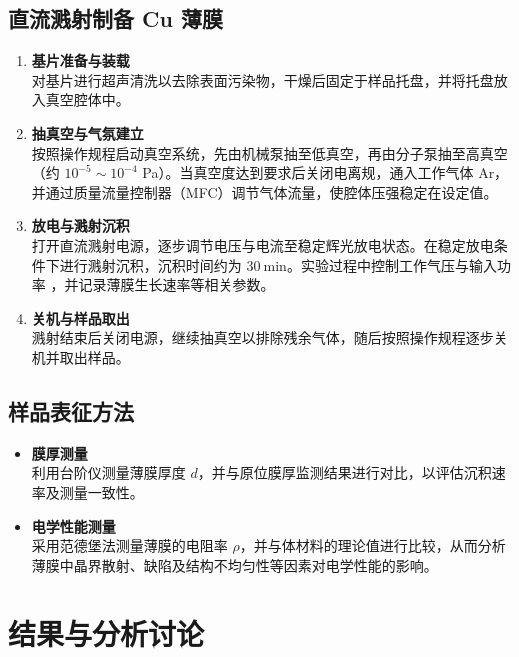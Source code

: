 \documentclass[a4paper, 1.5lines]{ctexart}
\begin{document}
        \subsection{直流溅射制备 Cu 薄膜}

\begin{enumerate}
    \item \textbf{基片准备与装载} \\
    对基片进行超声清洗以去除表面污染物，干燥后固定于样品托盘，并将托盘放入真空腔体中。

    \item \textbf{抽真空与气氛建立} \\
    按照操作规程启动真空系统，先由机械泵抽至低真空，再由分子泵抽至高真空（约 $10^{-5}\sim10^{-4}$ Pa）。当真空度达到要求后关闭电离规，通入工作气体 Ar，并通过质量流量控制器（MFC）调节气体流量，使腔体压强稳定在设定值。

    \item \textbf{放电与溅射沉积} \\
    打开直流溅射电源，逐步调节电压与电流至稳定辉光放电状态。在稳定放电条件下进行溅射沉积，沉积时间约为 $30\ \text{min}$。实验过程中控制工作气压与输入功率
    ，并记录薄膜生长速率等相关参数。

    \item \textbf{关机与样品取出} \\
    溅射结束后关闭电源，继续抽真空以排除残余气体，随后按照操作规程逐步关机并取出样品。
\end{enumerate}

\subsection{样品表征方法}

\begin{itemize}
    \item \textbf{膜厚测量} \\
    利用台阶仪测量薄膜厚度 $d$，并与原位膜厚监测结果进行对比，以评估沉积速率及测量一致性。

    \item \textbf{电学性能测量} \\
    采用范德堡法测量薄膜的电阻率 $\rho$，并与体材料的理论值进行比较，从而分析薄膜中晶界散射、缺陷及结构不均匀性等因素对电学性能的影响。
\end{itemize}

    \section{结果与分析讨论}
    
\end{document}
